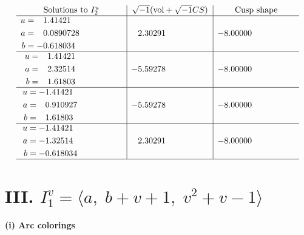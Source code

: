 \documentclass[1p]{elsarticle_modified}
\theoremstyle{definition}
\newcommand{\I}{\sqrt{-1}}
\begin{document}
$$\begin{array}{c|c|c}  
\text{Solutions to }I^u_{2}& \I (\text{vol} + \sqrt{-1}CS) & \text{Cusp shape}\\
 \hline 
\begin{aligned}
u &= \phantom{-}1.41421\phantom{ +0.000000I} \\
a &= \phantom{-}0.0890728\phantom{ +0.000000I} \\
b &= -0.618034\phantom{ +0.000000I}\end{aligned}
 & \phantom{-}2.30291\phantom{ +0.000000I} & -8.00000\phantom{ +0.000000I} \\ \hline\begin{aligned}
u &= \phantom{-}1.41421\phantom{ +0.000000I} \\
a &= \phantom{-}2.32514\phantom{ +0.000000I} \\
b &= \phantom{-}1.61803\phantom{ +0.000000I}\end{aligned}
 & -5.59278\phantom{ +0.000000I} & -8.00000\phantom{ +0.000000I} \\ \hline\begin{aligned}
u &= -1.41421\phantom{ +0.000000I} \\
a &= \phantom{-}0.910927\phantom{ +0.000000I} \\
b &= \phantom{-}1.61803\phantom{ +0.000000I}\end{aligned}
 & -5.59278\phantom{ +0.000000I} & -8.00000\phantom{ +0.000000I} \\ \hline\begin{aligned}
u &= -1.41421\phantom{ +0.000000I} \\
a &= -1.32514\phantom{ +0.000000I} \\
b &= -0.618034\phantom{ +0.000000I}\end{aligned}
 & \phantom{-}2.30291\phantom{ +0.000000I} & -8.00000\phantom{ +0.000000I}\\
 \hline 
 \end{array}$$\newpage\newpage\renewcommand{\arraystretch}{1}
\centering \section*{III. $I^v_{1}= \langle a,\;b+v+1,\;v^2+v-1 \rangle$}
\flushleft \textbf{(i) Arc colorings}\\
\end{document}
